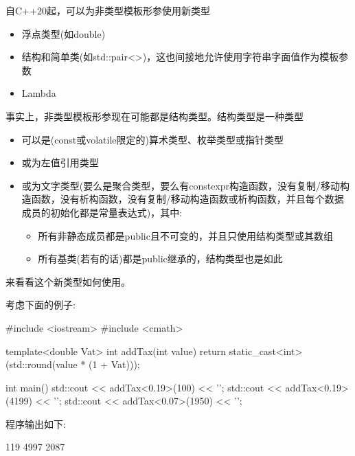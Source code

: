 
自C++20起，可以为非类型模板形参使用新类型

\begin{itemize}
\item
浮点类型(如double)

\item
结构和简单类(如std::pair<>)，这也间接地允许使用字符串字面值作为模板参数

\item
Lambda
\end{itemize}

事实上，非类型模板形参现在可能都是结构类型。结构类型是一种类型

\begin{itemize}
\item
可以是(const或volatile限定的)算术类型、枚举类型或指针类型

\item
或为左值引用类型

\item
或为文字类型(要么是聚合类型，要么有constexpr构造函数，没有复制/移动构造函数，没有析构函数，没有复制/移动构造函数或析构函数，并且每个数据成员的初始化都是常量表达式)，其中:

\begin{itemize}
\item
所有非静态成员都是public且不可变的，并且只使用结构类型或其数组

\item
所有基类(若有的话)都是public继承的，结构类型也是如此
\end{itemize}
\end{itemize}

来看看这个新类型如何使用。


考虑下面的例子:


\begin{cpp}
#include <iostream>
#include <cmath>

template<double Vat>
int addTax(int value)
{
	return static_cast<int>(std::round(value * (1 + Vat)));
}

int main()
{
	std::cout << addTax<0.19>(100) << '\n';
	std::cout << addTax<0.19>(4199) << '\n';
	std::cout << addTax<0.07>(1950) << '\n';
}
\end{cpp}

程序输出如下:

\begin{shell}
119
4997
2087
\end{shell}

